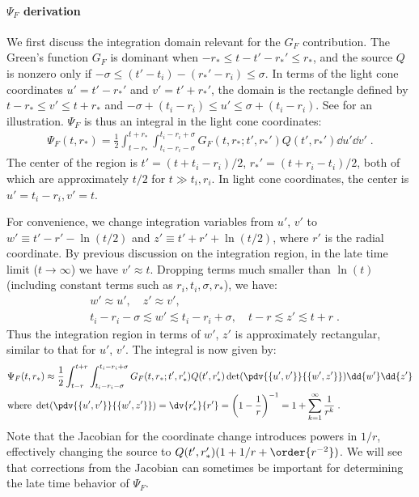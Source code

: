 \paragraph{$\Psi_F$ derivation}
We first discuss the integration domain relevant for the $G_F$ contribution.
The Green's function $G_F$ is dominant when $-r_* \leq t-t'-r_*' \leq r_*$, and the source $Q$ is nonzero only if $-\sigma \leq (t'-t_i)-(r_*'-r_i) \leq \sigma$.
In terms of the light cone coordinates $u' = t'-r_*'$ and $v' = t' + r_*'$, the domain is the rectangle defined by $t - r_* \leq v' \leq t + r_*$ and $-\sigma + (t_i-r_i) \leq u' \leq \sigma + (t_i-r_i)$.
See  for an illustration.
$\Psi_F$ is thus an integral in the light cone coordinates:
\begin{align}
  \Psi_F(t,r_*)
  =  \frac12 \int_{t-r_*}^{t+r_*} \int_{t_i-r_i-\sigma}^{t_i-r_i+\sigma} G_F(t,r_*; t', r_*') Q(t',r_*') \dd{u'} \dd{v'} \;.
\end{align}
The center of the region is $t' = (t+t_i-r_i)/2$, $r_*' = (t+r_i-t_i)/2$, both of which are approximately $t/2$ for $t \gg t_i, r_i$.
In light cone coordinates, the center is $u' = t_i-r_i, v' = t$.


For convenience, we change integration variables from $u'$, $v'$ to $w' \equiv t'-r' - \ln(t/2)$ and $z' \equiv t'+r' + \ln(t/2)$, where $r'$ is the radial coordinate.
By previous discussion on the integration region, in the late time limit ($t \to \infty$) we have $v' \approx t$.
Dropping terms much smaller than $\ln(t)$ (including constant terms such as $r_i,t_i,\sigma,r_*$), we have:
\begin{align}
  & w' \approx u',\quad z' \approx v', \nonumber \\
    & t_i-r_i-\sigma \lesssim w' \lesssim t_i-r_i+\sigma  , \quad
      t-r  \lesssim z' \lesssim t+r  \;.
\end{align}
Thus the integration region in terms of $w'$, $z'$ is approximately rectangular, similar to that for $u'$, $v'$.
The integral is now given by:
\begin{align}
  \label{eq:Psi_F_determinant_factor}
  & \Psi_F(t,r_*)
  \approx  \frac12 \int_{t-r}^{t+r} \int_{t_i-r_i-\sigma}^{t_i-r_i+\sigma} G_F(t,r_*; t', r_*') Q(t',r_*') \det(\pdv{\{u',v'\}}{\{w',z'\}}) \dd{w'} \dd{z'} \nonumber \\
  &\textrm{where } \det(\pdv{\{u',v'\}}{\{w',z'\}}) = \dv{r_*'}{r'} = \left(1 - \frac{1}{r}\right)^{-1} = 1 + \sum_{k=1}^\infty \frac{1}{r^k} \;.
\end{align}
Note that the Jacobian for the coordinate change introduces powers in $1/r$, effectively changing the source to $Q(t',r_*') (1 + 1/r + \order{r^{-2}})$.
We will see that corrections from the Jacobian can sometimes be important for determining the late time behavior of $\Psi_F$.


